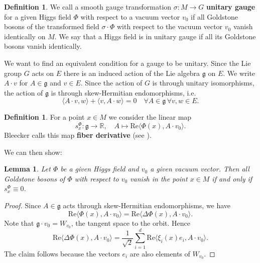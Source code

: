 \documentclass[12pt]{amsart}
\newtheorem{lem}[thm]{Lemma}
\theoremstyle{definition}
\newtheorem{defn}[thm]{Definition}
\theoremstyle{remark}
\numberwithin{equation}{section}
\begin{document}
\begin{defn}We call a smooth gauge transformation $\sigma\colon M\rightarrow G$ {\bf unitary gauge} for a given Higgs field $\Phi$ with respect to a vacuum vector $v_0$ if all Goldstone bosons of the transformed field $\sigma\cdot\Phi$ with respect to the vacuum vector $v_0$ vanish identically on $M$. We say that a Higgs field is in unitary gauge if all its Goldstone bosons vanish identically.
\end{defn}
We want to find an equivalent condition for a gauge to be unitary. Since the Lie group $G$ acts on $E$ there is an induced action of the Lie algebra $\mathfrak{g}$ on $E$. We write $A\cdot v$ for $A\in\mathfrak{g}$ and $v\in E$. Since the action of $G$ is through unitary isomorphisms, the action of $\mathfrak{g}$ is through skew-Hermitian endomorphisms, i.e.
\begin{equation*}
\langle A\cdot v,w\rangle+ \langle v,A\cdot w\rangle=0\quad\forall A\in\mathfrak{g}\,\forall v,w\in E.
\end{equation*}
\begin{defn}For a point $x\in M$ we consider the linear map 
\begin{equation*}
s^\Phi_x\colon\mathfrak{g}\longrightarrow\mathbb{R},\quad A\longmapsto\mathrm{Re}\langle\Phi(x),A\cdot v_0\rangle.
\end{equation*}
Bleecker calls this map {\bf fiber derivative} (see \cite{Bleecker}).
\end{defn}
We can then show:
\begin{lem}Let $\Phi$ be a given Higgs field and $v_0$ a given vacuum vector. Then all Goldstone bosons of $\Phi$ with respect to $v_0$ vanish in the point $x\in M$ if and only if $s^\Phi_x\equiv 0$.
\end{lem}
\begin{proof} Since $A\in\mathfrak{g}$ acts through skew-Hermitian endomorphisms, we have 
\begin{equation*}
\mathrm{Re}\langle\Phi(x),A\cdot v_0\rangle =\mathrm{Re}\langle \Delta\Phi(x),A\cdot v_0\rangle.
\end{equation*} 
Note that $\mathfrak{g}\cdot v_0=W_{v_0}$, the tangent space to the orbit. Hence 
\begin{equation*}
\mathrm{Re}\langle \Delta\Phi(x),A\cdot v_0\rangle=\frac{1}{\sqrt{2}}\sum_{i=1}^d\mathrm{Re}\langle\xi_i(x)e_i,A\cdot v_0\rangle.
\end{equation*}
The claim follows because the vectors $e_i$ are also elements of $W_{v_0}$.
\end{proof}
\end{document}
